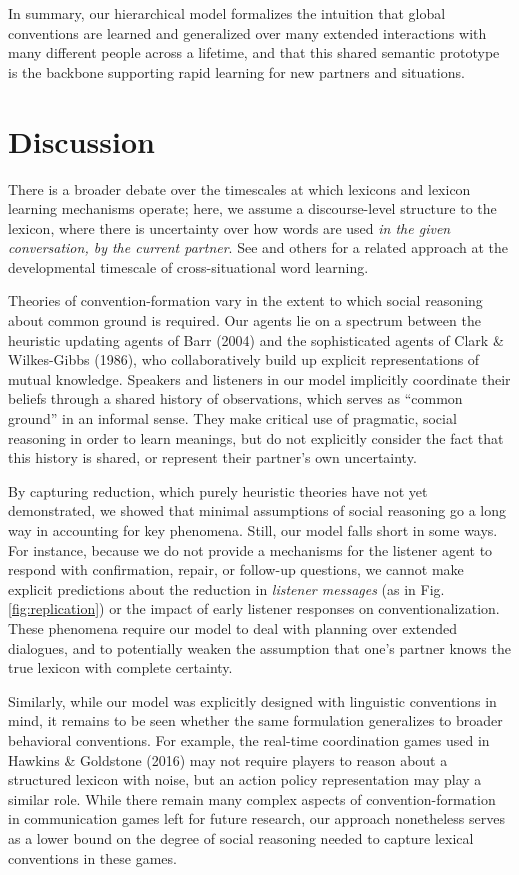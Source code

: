 In summary, our hierarchical model formalizes the intuition that global conventions are learned and generalized over many extended interactions with many different people across a lifetime, and that this shared semantic prototype is the backbone supporting rapid learning for new partners and situations. 


\section{Discussion}

There is a broader debate over the timescales at which lexicons and lexicon learning mechanisms operate; here, we assume a discourse-level structure to the lexicon, where there is uncertainty over how words are used \emph{in the given conversation, by the current partner}. See \cite{FrankGoodmanTenenbaum09_Wurwur} and others for a related approach at the developmental timescale of cross-situational word learning.

Theories of convention-formation vary in the extent to which social reasoning about common ground is required. 
Our agents lie on a spectrum between the heuristic updating agents of Barr (2004) and the sophisticated agents of Clark \& Wilkes-Gibbs (1986), who collaboratively build up explicit representations of mutual knowledge. 
Speakers and listeners in our model implicitly coordinate their beliefs through a shared history of observations, which serves as ``common ground'' in an informal sense.
They make critical use of pragmatic, social reasoning in order to learn meanings, but do not explicitly consider the fact that this history is shared, or represent their partner's own uncertainty.

By capturing reduction, which purely heuristic theories have not yet demonstrated, we showed that minimal assumptions of social reasoning go a long way in accounting for key phenomena. 
Still, our model falls short in some ways. 
For instance, because we do not provide a mechanisms for the listener agent to respond with confirmation, repair, or follow-up questions, we cannot make explicit predictions about the reduction in \emph{listener messages} (as in Fig. \ref{fig:replication}) or the impact of early listener responses on conventionalization. 
These phenomena require our model to deal with planning over extended dialogues, and to potentially weaken the assumption that one's partner knows the true lexicon with complete certainty. 

Similarly, while our model was explicitly designed with linguistic conventions in mind, it remains to be seen whether the same formulation generalizes to broader behavioral conventions. 
For example, the real-time coordination games used in Hawkins \& Goldstone (2016) may not require players to reason about a structured lexicon with noise, but an action policy representation may play a similar role. 
While there remain many complex aspects of convention-formation in communication games left for future research, our approach nonetheless serves as a lower bound on the degree of social reasoning needed to capture lexical conventions in these games.
